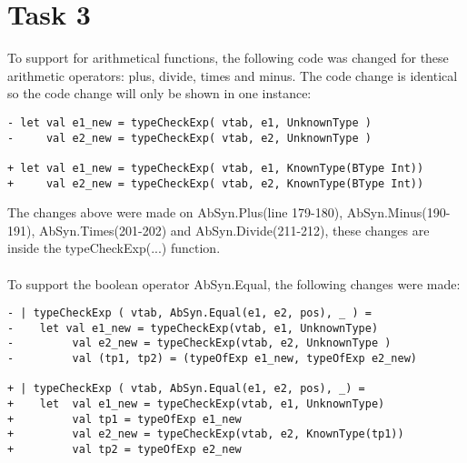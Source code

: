 \section{Task 3}
To support for arithmetical functions, the following code was changed for these
arithmetic operators: plus, divide, times and minus. The code change is
identical so the code change will only be shown in one instance:
\begin{lstlisting}[style=MLStyle]
- let val e1_new = typeCheckExp( vtab, e1, UnknownType )
-     val e2_new = typeCheckExp( vtab, e2, UnknownType )

+ let val e1_new = typeCheckExp( vtab, e1, KnownType(BType Int))
+     val e2_new = typeCheckExp( vtab, e2, KnownType(BType Int))
\end{lstlisting}

The changes above were made on AbSyn.Plus(line 179-180), AbSyn.Minus(190-191),
AbSyn.Times(201-202) and AbSyn.Divide(211-212), these changes are inside the
typeCheckExp(...) function.\\
\\
To support the boolean operator AbSyn.Equal, the following changes were made:
\begin{lstlisting}[style=MLStyle]
- | typeCheckExp ( vtab, AbSyn.Equal(e1, e2, pos), _ ) =
-    let val e1_new = typeCheckExp(vtab, e1, UnknownType)
-         val e2_new = typeCheckExp(vtab, e2, UnknownType )
-         val (tp1, tp2) = (typeOfExp e1_new, typeOfExp e2_new)

+ | typeCheckExp ( vtab, AbSyn.Equal(e1, e2, pos), _) =
+    let  val e1_new = typeCheckExp(vtab, e1, UnknownType)
+         val tp1 = typeOfExp e1_new
+         val e2_new = typeCheckExp(vtab, e2, KnownType(tp1))
+         val tp2 = typeOfExp e2_new 
\end{lstlisting}

